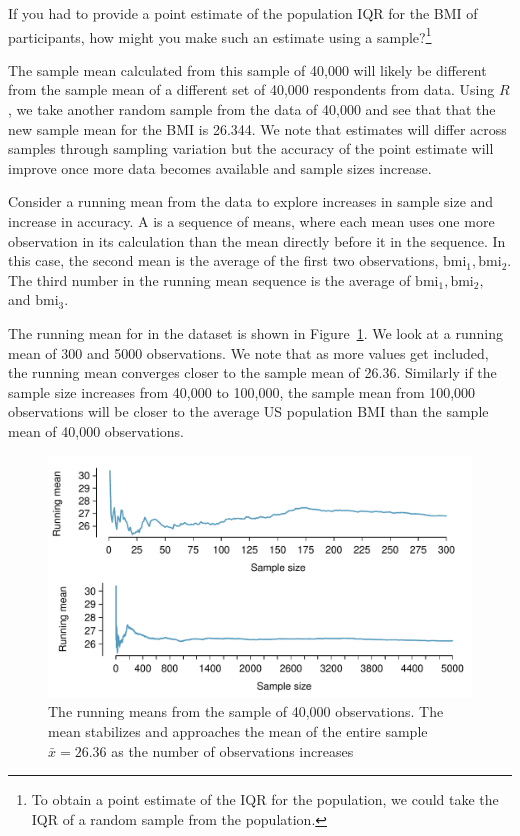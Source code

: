 \begin{exercise}
If you had to provide a point estimate of the population IQR for the BMI of participants, how might you make such an estimate using a sample?\footnote{To obtain a point estimate of the IQR for the population, we could take the IQR of a random sample from the population.}


\end{exercise}

The sample mean calculated from this  sample of 40,000 will likely be different from the sample mean of a different set of 40,000 respondents from  data. Using $R$, we take another random sample from the  data of 40,000 and see that that the new sample mean for the BMI is 26.344. We note that estimates will differ across samples through sampling variation but the accuracy of the point estimate will improve once more data becomes available and sample sizes increase.

Consider a running mean from the  data to explore increases in sample size and increase in accuracy. A  is a sequence of means, where each mean uses one more observation in its calculation than the mean directly before it in the sequence. In this case, the second mean is the average of the first two observations, $\mathrm{bmi}_1, \mathrm{bmi}_2$. The third number in the running mean sequence is the average of $\mathrm{bmi}_1, \mathrm{bmi}_2,$ and $\mathrm{bmi}_3$. 

The running mean for  in the  dataset is shown in Figure~\ref{BMIRunningMean}. We look at a running mean of 300 and 5000 observations. We note that as more values get included, the running mean converges closer to the sample mean of 26.36. Similarly if the sample size increases from 40,000 to 100,000, the sample mean from 100,000 observations will be closer to the average US population BMI than the sample mean of 40,000 observations. 

\begin{figure}
   \centering
   \includegraphics[width=\textwidth]{ch_inference_foundations_oi_biostat/figures/brfssBMIRunningMean/brfssBMIRunningMean}
   \caption{The running means from the  sample of 40,000 observations. The mean stabilizes and approaches the mean of the entire sample $\bar{x} = 26.36$ as the number of observations increases}
      \label{BMIRunningMean}
\end{figure}

